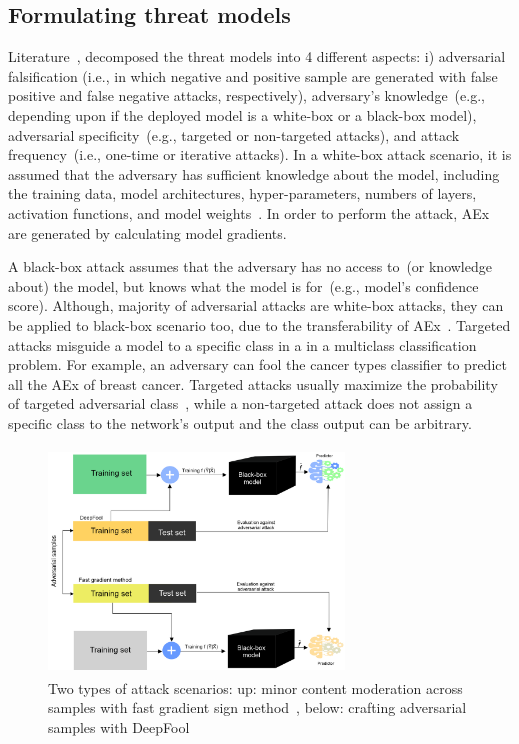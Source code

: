 \subsection{Formulating threat models}
Literature~\cite{yuan2019adversarial}, decomposed the threat models into 4 different aspects: i) adversarial falsification (i.e., in which negative and positive sample are generated with false positive and false negative attacks, respectively), adversary's knowledge~(e.g., depending upon if the deployed model is a white-box or a black-box model), adversarial specificity~(e.g., targeted or non-targeted attacks), and attack frequency~(i.e., one-time or iterative attacks). In a white-box attack scenario, it is assumed that the adversary has sufficient knowledge about the model, including the training data, model architectures, hyper-parameters, numbers of layers, activation functions, and model weights~\cite{yuan2019adversarial}. In order to perform the attack, AEx are generated by calculating model gradients. 

\hspace*{3.5mm} A black-box attack assumes that the adversary has no access to~(or knowledge about) the  model, but knows what the model is for~(e.g., model's confidence score). Although, majority of adversarial attacks are white-box attacks, they can be applied to black-box scenario too, due to the transferability of AEx~\cite{papernot2016transferability}. Targeted attacks misguide a model to a specific class in a in a multiclass classification problem. For example, an adversary can fool the cancer types classifier to predict all the AEx of breast cancer. Targeted attacks usually maximize the probability of targeted adversarial class~\cite{yuan2019adversarial}, while a non-targeted attack does not assign a specific class to the network's output and the class output can be arbitrary. %

\begin{figure}[htp!]
    \centering
    \includegraphics[width=0.7\textwidth,height=60mm]{images/aattacks.png}
    \caption[Formulating adversarial threat model]{Two types of attack scenarios: up: minor content moderation across samples with fast gradient sign method~\cite{goodfellow2014explaining}, below: crafting adversarial samples with DeepFool}
    \label{fig:aattacks}
    \vspace{-2mm}
\end{figure}

